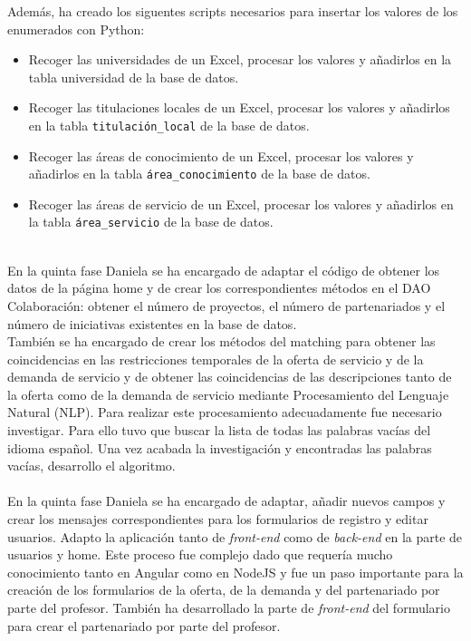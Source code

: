 \documentclass[11pt]{book}
\begin{document}
  Además, ha creado los siguentes scripts necesarios para insertar los valores de los enumerados con Python:
\begin{itemize} 
	\item Recoger las universidades de un Excel, procesar los valores y añadirlos en la tabla universidad de la base de datos.
	\item Recoger las titulaciones locales de un Excel, procesar los valores y añadirlos en la tabla \texttt{titulación\_local} de la base de datos.
	\item Recoger las áreas de conocimiento de un Excel, procesar los valores y añadirlos en la tabla \texttt{área\_conocimiento} de la base de datos.
	\item Recoger las áreas de servicio de un Excel, procesar los valores y añadirlos en la tabla \texttt{área\_servicio} de la base de datos.\\\\
\end{itemize}
En la quinta fase Daniela se ha encargado de adaptar el código de obtener los datos de la página home y de crear los correspondientes métodos en el DAO Colaboración: obtener el número de proyectos, el número de partenariados y el número de iniciativas existentes en la base de datos.\\ 
También se ha encargado de crear los métodos del matching para obtener las coincidencias en las restricciones temporales de la oferta de servicio y de la demanda de servicio y de obtener las coincidencias de las descripciones tanto de la oferta como de la demanda de servicio mediante Procesamiento del Lenguaje Natural (NLP). Para realizar este procesamiento adecuadamente fue necesario investigar. Para ello tuvo que buscar la lista de todas las palabras vacías del idioma español. Una vez acabada la investigación y encontradas las palabras vacías, desarrollo el algoritmo.\\\\
En la quinta fase Daniela se ha encargado de adaptar, añadir nuevos campos y crear los mensajes correspondientes para los formularios de registro y editar usuarios. Adapto la aplicación tanto de \textit{front-end} como de \textit{back-end} en la parte de usuarios y home. Este proceso fue complejo dado que requería mucho conocimiento tanto en Angular como en NodeJS y fue un paso importante para la creación de los formularios de la oferta, de la demanda y del partenariado por parte del profesor. También ha desarrollado la parte de \textit{front-end} del formulario para crear el partenariado por parte del profesor.
\end{document}

